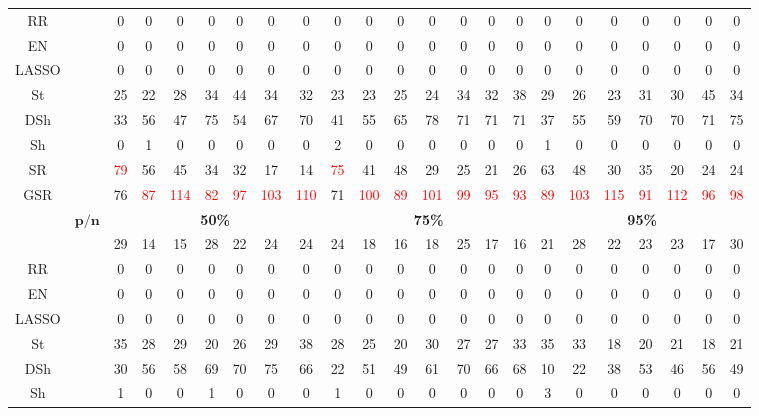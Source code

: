 \begin{table}
{\begin{tabular*}{\textwidth}{@{\extracolsep{\fill}}cc|ccccccc|ccccccc|ccccccc@{}}
RR &  & 0 & 0 & 0 & 0 & 0 & 0 & 0 & 0 & 0 & 0 & 0 & 0 & 0 & 0 & 0 & 0 & 0 & 0 & 0 & 0 & 0 \\
EN &  & 0 & 0 & 0 & 0 & 0 & 0 & 0 & 0 & 0 & 0 & 0 & 0 & 0 & 0 & 0 & 0 & 0 & 0 & 0 & 0 & 0 \\
LASSO &  & 0 & 0 & 0 & 0 & 0 & 0 & 0 & 0 & 0 & 0 & 0 & 0 & 0 & 0 & 0 & 0 & 0 & 0 & 0 & 0 & 0 \\
St &  & 25 & 22 & 28 & 34 & 44 & 34 & 32 & 23 & 23 & 25 & 24 & 34 & 32 & 38 & 29 & 26 & 23 & 31 & 30 & 45 & 34 \\
DSh &  & 33 & 56 & 47 & 75 & 54 & 67 & 70 & 41 & 55 & 65 & 78 & 71 & 71 & 71 & 37 & 55 & 59 & 70 & 70 & 71 & 75 \\
Sh &  & 0 & 1 & 0 & 0 & 0 & 0 & 0 & 2 & 0 & 0 & 0 & 0 & 0 & 0 & 1 & 0 & 0 & 0 & 0 & 0 & 0 \\
SR &  & \textcolor{red}{79} & 56 & 45 & 34 & 32 & 17 & 14 & \textcolor{red}{75} & 41 & 48 & 29 & 25 & 21 & 26 & 63 & 48 & 30 & 35 & 20 & 24 & 24 \\
GSR &  & 76 & \textcolor{red}{87} & \textcolor{red}{114} & \textcolor{red}{82} & \textcolor{red}{97} & \textcolor{red}{103} & \textcolor{red}{110} & 71 & \textcolor{red}{100} & \textcolor{red}{89} & \textcolor{red}{101} & \textcolor{red}{99} & \textcolor{red}{95} & \textcolor{red}{93} & \textcolor{red}{89} & \textcolor{red}{103} & \textcolor{red}{115} & \textcolor{red}{91} & \textcolor{red}{112} & \textcolor{red}{96} & \textcolor{red}{98} \\
\hline
\multirow{2}{*}{} & $\bm{p/n}$ & \multicolumn{7}{c|}{\textbf{50\%}} & \multicolumn{7}{c|}{\textbf{75\%}} & \multicolumn{7}{c}{\textbf{95\%}} \\
\hline
OLS &  & 29 & 14 & 15 & 28 & 22 & 24 & 24 & 24 & 18 & 16 & 18 & 25 & 17 & 16 & 21 & 28 & 22 & 23 & 23 & 17 & 30 \\
RR &  & 0 & 0 & 0 & 0 & 0 & 0 & 0 & 0 & 0 & 0 & 0 & 0 & 0 & 0 & 0 & 0 & 0 & 0 & 0 & 0 & 0 \\
EN &  & 0 & 0 & 0 & 0 & 0 & 0 & 0 & 0 & 0 & 0 & 0 & 0 & 0 & 0 & 0 & 0 & 0 & 0 & 0 & 0 & 0 \\
LASSO &  & 0 & 0 & 0 & 0 & 0 & 0 & 0 & 0 & 0 & 0 & 0 & 0 & 0 & 0 & 0 & 0 & 0 & 0 & 0 & 0 & 0 \\
St &  & 35 & 28 & 29 & 20 & 26 & 29 & 38 & 28 & 25 & 20 & 30 & 27 & 27 & 33 & 35 & 33 & 18 & 20 & 21 & 18 & 21 \\
DSh &  & 30 & 56 & 58 & 69 & 70 & 75 & 66 & 22 & 51 & 49 & 61 & 70 & 66 & 68 & 10 & 22 & 38 & 53 & 46 & 56 & 49 \\
Sh &  & 1 & 0 & 0 & 1 & 0 & 0 & 0 & 1 & 0 & 0 & 0 & 0 & 0 & 0 & 3 & 0 & 0 & 0 & 0 & 0 & 0 \\

\end{tabular*}}
\end{table}
